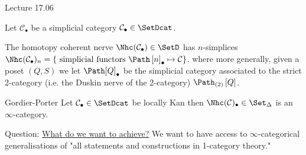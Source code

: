Lecture 17.06

Let $\mathcal{ C }_\bullet $ be a simplicial category $ \mathcal{ C }_\bullet \in \SetDcat $.

\begin{defi}
	The homotopy coherent nerve $ \Nhc ( \mathcal{ C }_{ \bullet } ) \in \SetD $ has $ n $-simplices $ \Nhc ( \mathcal{ C }_{ \bullet } )_n = \{ \text{ simplicial functors } \Path \left[ n  \right]_{ \bullet } \mapsto \mathcal{ C } \} $.
	where more generally, given a poset $ ( Q , S ) $ we let $ \Path [ Q ]_{ \bullet } $ be the simplicial category associated to the strict 2-category (i.e. the Duskin nerve of the 2-category) $ \Path_{ ( 2 ) } \left[ Q \right] $.
\end{defi} 

\begin{thm}{Gordier-Porter}
	Let $ \mathcal{ C }_\bullet \in \SetDcat $ be locally Kan then $ \Nhc ( \mathcal{ C } )_\bullet \in \Set_\Delta $ is an $ \infty $-category.
\end{thm}

Question: \underline{What do we want to achieve?}
We want to have access to $ \infty $-categorical generalisations of "all statements and constructions in 1-category theory."

